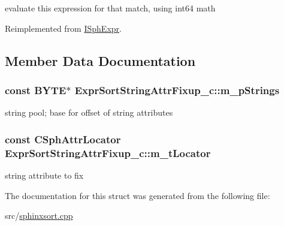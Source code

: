 evaluate this expression for that match, using int64 math 



Reimplemented from \hyperlink{structISphExpr_a4f14fae00cc5ebd877ce86419d4fed03}{I\-Sph\-Expr}.



\subsection{Member Data Documentation}
\hypertarget{structExprSortStringAttrFixup__c_a67a18607b048079cf456c6be1a2d74a1}{
\subsubsection[{m\-\_\-p\-Strings}]{\setlength{\rightskip}{0pt plus 5cm}const {\bf B\-Y\-T\-E}$\ast$ Expr\-Sort\-String\-Attr\-Fixup\-\_\-c\-::m\-\_\-p\-Strings}}\label{structExprSortStringAttrFixup__c_a67a18607b048079cf456c6be1a2d74a1}


string pool; base for offset of string attributes 

\hypertarget{structExprSortStringAttrFixup__c_aaf3c5d556cc79339326665168881439b}{
\subsubsection[{m\-\_\-t\-Locator}]{\setlength{\rightskip}{0pt plus 5cm}const {\bf C\-Sph\-Attr\-Locator} Expr\-Sort\-String\-Attr\-Fixup\-\_\-c\-::m\-\_\-t\-Locator}}\label{structExprSortStringAttrFixup__c_aaf3c5d556cc79339326665168881439b}


string attribute to fix 



The documentation for this struct was generated from the following file\-:\begin{DoxyCompactItemize}
\item 
src/\hyperlink{sphinxsort_8cpp}{sphinxsort.\-cpp}\end{DoxyCompactItemize}
